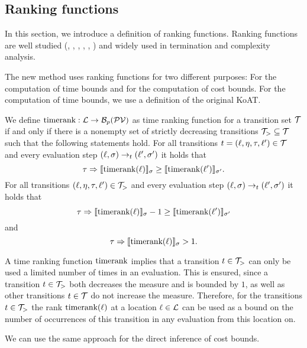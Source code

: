 \subsection{Ranking functions}

In this section, we introduce a definition of ranking functions.
Ranking functions are well studied (\cite{bradley2005polyranking}, \cite{podelski2004prf}, \cite{bradley2005linear}, \cite{bagnara2012new}, \cite{leike2014ranking}, \cite{ben2013linear}) and widely used in termination and complexity analysis.

The new method uses ranking functions for two different purposes:
For the computation of time bounds and for the computation of cost bounds.
For the computation of time bounds, we use a definition of the original KoAT.

\begin{definition} 
  We define $\text{timerank}: \mathcal{L} \rightarrow \mathcal{B}_p(\mathcal{PV})$ as time ranking function for a transition set $\mathcal{T}$ if and only if there is a nonempty set of strictly decreasing transitions $\mathcal{T}_{>} \subseteq \mathcal{T}$ such that the following statements hold.
  For all transitions $t = (\ell, \eta, \tau, \ell') \in \mathcal{T}$ and every evaluation step $(\ell, \sigma) \rightarrow_t (\ell', \sigma')$ it holds that
  \[ \tau \Rightarrow \llbracket \text{timerank}(\ell) \rrbracket_{\sigma} \geq \llbracket \text{timerank}(\ell') \rrbracket_{\sigma'}. \]
  For all transitions $(\ell, \eta, \tau, \ell') \in \mathcal{T}_{>}$ and every evaluation step $(\ell, \sigma) \rightarrow_t (\ell', \sigma')$ it holds that        
  \[ \tau \Rightarrow \llbracket \text{timerank}(\ell) \rrbracket_{\sigma} - 1 \geq \llbracket \text{timerank}(\ell') \rrbracket_{\sigma'} \]
  and
  \[ \tau \Rightarrow \llbracket \text{timerank}(\ell) \rrbracket_{\sigma} > 1. \]
\end{definition}

A time ranking function $\text{timerank}$ implies that a transition $t \in \mathcal{T}_>$ can only be used a limited number of times in an evaluation.
This is ensured, since a transition $t \in \mathcal{T}_>$ both decreases the measure and is bounded by $1$, as well as other transitions $t \in \mathcal{T}$ do not increase the measure.
Therefore, for the transitions $t \in \mathcal{T}_>$ the rank $\text{timerank}(\ell)$ at a location $\ell \in \mathcal{L}$ can be used as a bound on the number of occurrences of this transition in any evaluation from this location on.

We can use the same approach for the direct inference of cost bounds.

